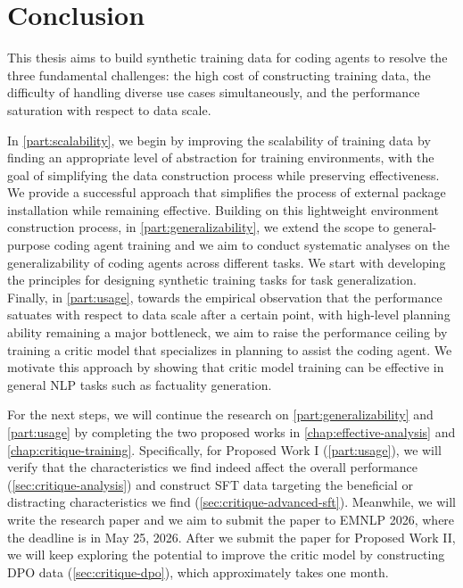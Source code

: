 \documentclass[12pt,openany]{cmuthesis}
\begin{document}




\chapter{Conclusion}
This thesis aims to build synthetic training data for coding agents to resolve the three fundamental challenges: the high cost of constructing training data, the difficulty of handling diverse use cases simultaneously, and the performance saturation with respect to data scale.

In \autoref{part:scalability}, we begin by improving the scalability of training data by finding an appropriate level of abstraction for training environments, with the goal of simplifying the data construction process while preserving effectiveness.
We provide a successful approach that simplifies the process of external package installation while remaining effective.
Building on this lightweight environment construction process, in \autoref{part:generalizability}, we extend the scope to general-purpose coding agent training and we aim to conduct systematic analyses on the generalizability of coding agents across different tasks. We start with developing the principles for designing synthetic training tasks for task generalization.
Finally, in \autoref{part:usage}, towards the empirical observation that the performance satuates with respect to data scale after a certain point, with high-level planning ability remaining a major bottleneck, we aim to raise the performance ceiling by training a critic model that specializes in planning to assist the coding agent. We motivate this approach by showing that critic model training can be effective in general NLP tasks such as factuality generation.

For the next steps, we will continue the research on \autoref{part:generalizability} and \autoref{part:usage} by completing the two proposed works in \autoref{chap:effective-analysis} and \autoref{chap:critique-training}.
Specifically, for Proposed Work I (\autoref{part:usage}), we will verify that the characteristics we find indeed affect the overall performance (\autoref{sec:critique-analysis}) and construct SFT data targeting the beneficial or distracting characteristics we find (\autoref{sec:critique-advanced-sft}). 
Meanwhile, we will write the research paper and we aim to submit the paper to EMNLP 2026, where the deadline is in May 25, 2026.
After we submit the paper for Proposed Work II, we will keep exploring the potential to improve the critic model by constructing DPO data (\autoref{sec:critique-dpo}), which approximately takes one month.
\end{document}

